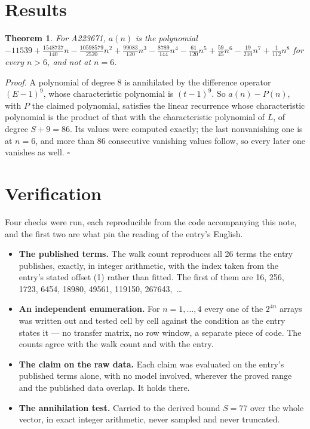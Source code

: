 \documentclass[11pt]{article}
\newtheorem{theorem}{Theorem}
\theoremstyle{definition}
\begin{document}
\section{Results}

\begin{theorem} For A223671, $a(n)$ is the polynomial $-11539 + \frac{1548737}{140}n - \frac{10598579}{2520}n^{2} + \frac{99083}{120}n^{3} - \frac{8789}{144}n^{4} - \frac{61}{120}n^{5} + \frac{59}{45}n^{6} - \frac{19}{210}n^{7} + \frac{1}{112}n^{8}$ for every $n > 6$, and not at $n = 6$.\end{theorem}

{\itshape Proof.} A polynomial of degree $8$ is annihilated by the difference operator $(E-1)^{9}$, whose characteristic polynomial is $(t-1)^{9}$. So $a(n) - P(n)$, with $P$ the claimed polynomial, satisfies the linear recurrence whose characteristic polynomial is the product of that with the characteristic polynomial of $L$, of degree $S + 9 = 86$. Its values were computed exactly; the last nonvanishing one is at $n = 6$, and more than $86$ consecutive vanishing values follow, so every later one vanishes as well. $\square$

\section{Verification}

Four checks were run, each reproducible from the code accompanying this note, and the first two are what pin the reading of the entry's English.

\begin{itemize}

\item {\bfseries The published terms.} The walk count reproduces all 26 terms the entry publishes, exactly, in integer arithmetic, with the index taken from the entry's stated offset (1) rather than fitted. The first of them are 16, 256, 1723, 6454, 18980, 49561, 119150, 267643,~\dots

\item {\bfseries An independent enumeration.} For $n = 1,\dots,4$ every one of the $2^{4n}$ arrays was written out and tested cell by cell against the condition as the entry states it --- no transfer matrix, no row window, a separate piece of code. The counts agree with the walk count and with the entry.

\item {\bfseries The claim on the raw data.} Each claim was evaluated on the entry's published terms alone, with no model involved, wherever the proved range and the published data overlap. It holds there.

\item {\bfseries The annihilation test.} Carried to the derived bound $S = 77$ over the whole vector, in exact integer arithmetic, never sampled and never truncated.

\end{itemize}
\end{document}
